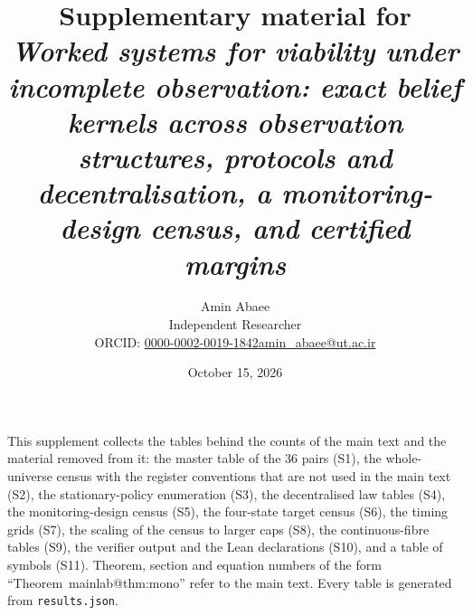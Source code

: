 \documentclass[11pt,a4paper]{article}
\makeatletter
\theoremstyle{plain}
\theoremstyle{definition}
\theoremstyle{remark}
\newcommand{\mref}[1]{\csname mainlab@#1\endcsname}
\makeatother
\begin{document}
\title{\textbf{Supplementary material for}\\ \emph{Worked systems for viability under incomplete observation: exact belief kernels across observation structures, protocols and decentralisation, a monitoring-design census, and certified margins}}
\author{Amin Abaee\\[0.3em]{\small Independent Researcher}\\[0.2em]{\small ORCID: \href{https://orcid.org/0000-0002-0019-1842}{0000-0002-0019-1842}\quad \href{mailto:amin_abaee@ut.ac.ir}{amin\_abaee@ut.ac.ir}}}
\date{October 15, 2026}
\maketitle

\noindent This supplement collects the tables behind the counts of the main text and the material removed from it: the master table of the $36$ pairs (S1), the whole-universe census with the register conventions that are not used in the main text (S2), the stationary-policy enumeration (S3), the decentralised law tables (S4), the monitoring-design census (S5), the four-state target census (S6), the timing grids (S7), the scaling of the census to larger caps (S8), the continuous-fibre tables (S9), the verifier output and the Lean declarations (S10), and a table of symbols (S11). Theorem, section and equation numbers of the form ``Theorem~\mref{thm:mono}'' refer to the main text. Every table is generated from \texttt{results.json}.
\end{document}
